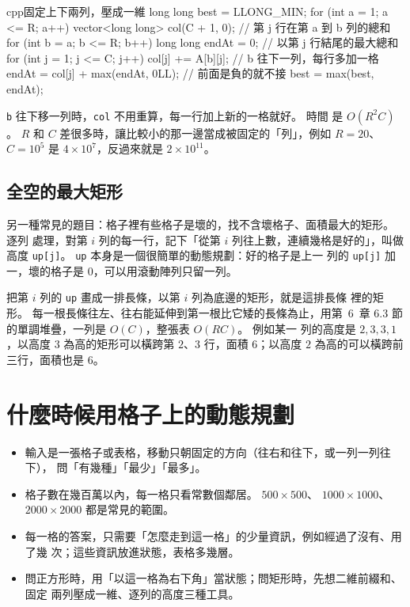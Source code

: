\begin{code}{cpp}{固定上下兩列，壓成一維}
long long best = LLONG_MIN;
for (int a = 1; a <= R; a++) {
    vector<long long> col(C + 1, 0);  // 第 j 行在第 a 到 b 列的總和
    for (int b = a; b <= R; b++) {
        long long endAt = 0;          // 以第 j 行結尾的最大總和
        for (int j = 1; j <= C; j++) {
            col[j] += A[b][j];        // b 往下一列，每行多加一格
            endAt = col[j] + max(endAt, 0LL);  // 前面是負的就不接
            best = max(best, endAt);
        }
    }
}
\end{code}
\texttt{b} 往下移一列時，\texttt{col} 不用重算，每一行加上新的一格就好。 時間
是 $O(R^2 C)$。 $R$ 和 $C$ 差很多時，讓比較小的那一邊當成被固定的「列」，例如
$R = 20$、$C = 10^5$ 是 $4 \times 10^7$，反過來就是 $2 \times 10^{11}$。

\subsection{全空的最大矩形}

另一種常見的題目：格子裡有些格子是壞的，找不含壞格子、面積最大的矩形。 逐列
處理，對第 $i$ 列的每一行，記下「從第 $i$ 列往上數，連續幾格是好的」，叫做
高度 \texttt{up[j]}。 \texttt{up} 本身是一個很簡單的動態規劃：好的格子是上一
列的 \texttt{up[j]} 加一，壞的格子是 $0$，可以用滾動陣列只留一列。

把第 $i$ 列的 \texttt{up} 畫成一排長條，以第 $i$ 列為底邊的矩形，就是這排長條
裡的矩形。 每一根長條往左、往右能延伸到第一根比它矮的長條為止，用第~6~章
6.3 節的單調堆疊，一列是 $O(C)$，整張表 $O(RC)$。 例如某一
列的高度是 $2, 3, 3, 1$，以高度 $3$ 為高的矩形可以橫跨第 $2$、$3$ 行，面積
$6$；以高度 $2$ 為高的可以橫跨前三行，面積也是 $6$。

\section{什麼時候用格子上的動態規劃}
\label{sec:dp2-when}

\begin{itemize}
\item 輸入是一張格子或表格，移動只朝固定的方向（往右和往下，或一列一列往下），
問「有幾種」「最少」「最多」。
\item 格子數在幾百萬以內，每一格只看常數個鄰居。 $500 \times 500$、
$1000 \times 1000$、$2000 \times 2000$ 都是常見的範圍。
\item 每一格的答案，只需要「怎麼走到這一格」的少量資訊，例如經過了沒有、用了幾
次；這些資訊放進狀態，表格多幾層。
\item 問正方形時，用「以這一格為右下角」當狀態；問矩形時，先想二維前綴和、固定
兩列壓成一維、逐列的高度三種工具。
\end{itemize}

